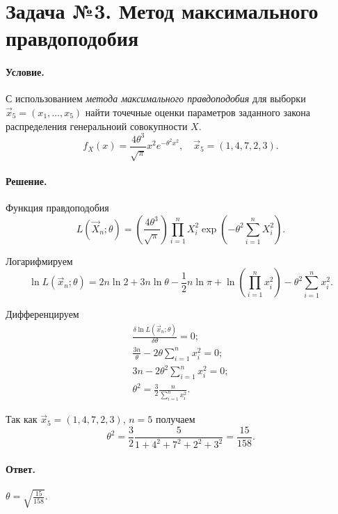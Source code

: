 
\section{Задача №3. Метод максимального правдоподобия}

\paragraph{Условие.} С использованием \emph{метода максимального правдоподобия} для выборки $\vec{x}_5 = (x_1, \dots, x_5)$ найти точечные оценки параметров заданного закона распределения генеральноий совокупности $X$.
\[
    f_X(x) = \frac{4\theta^3}{\sqrt{\pi}} x^2 e^{-\theta^2 x^2}, \quad \vec{x}_5 = (1, 4, 7, 2, 3).
\]

\paragraph{Решение.}

\noindent
Функция правдоподобия
\[
    L(\vec{X}_n; \theta) = \left( \frac{4 \theta^3}{\sqrt{\pi}} \right) \prod_{i = 1}^{n} X_i^2 \exp \left( - \theta^2 \sum_{i = 1}^n X_i^2 \right).
\]

\noindent
Логарифмируем
\[
    \ln L(\vec{x}_n; \theta) = 2n \ln 2 + 3n \ln \theta - \frac{1}{2} n \ln\pi + \ln\left( \prod_{i = 1}^{n} x_i^2 \right) - \theta^2 \sum_{i = 1}^n x_i^2.
\]

\noindent
Дифференцируем
\begin{align*}
    \frac{\delta\ln L(\vec{x}_n; \theta)}{\delta\theta} = 0;
    \\
    \frac{3n}{\theta} - 2 \theta \sum_{i = 1}^n x_i^2 = 0;
    \\
    3n - 2\theta^2\sum_{i = 1}^n x_i^2 = 0;
    \\
    \theta^2 = \frac{3}{2}\frac{n}{\sum_{i = 1}^n x_i^2}.
\end{align*}

\noindent
Так как $\vec{x}_5 = (1, 4, 7, 2, 3)$, $n = 5$ получаем
\[
    \theta^2 = \frac{3}{2} \frac{5}{1 + 4^2 + 7^2 + 2^2 + 3^2} = \frac{15}{158}.
\]

\paragraph{Ответ.} $\displaystyle\theta = \sqrt{\frac{15}{158}}$.